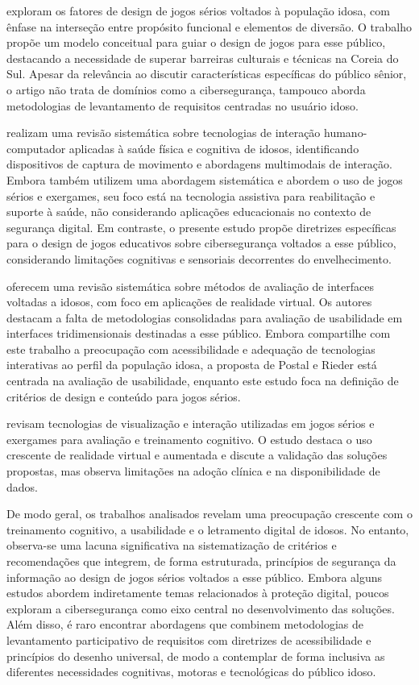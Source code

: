 \cite{lee2019study} exploram os fatores de design de jogos sérios voltados à população idosa, com ênfase na interseção entre propósito funcional e elementos de diversão. O trabalho propõe um modelo conceitual para guiar o design de jogos para esse público, destacando a necessidade de superar barreiras culturais e técnicas na Coreia do Sul. Apesar da relevância ao discutir características específicas do público sênior, o artigo não trata de domínios como a cibersegurança, tampouco aborda metodologias de levantamento de requisitos centradas no usuário idoso.

\cite{cedillo2025systematic} realizam uma revisão sistemática sobre tecnologias de interação humano-computador aplicadas à saúde física e cognitiva de idosos, identificando dispositivos de captura de movimento e abordagens multimodais de interação. Embora também utilizem uma abordagem sistemática e abordem o uso de jogos sérios e exergames, seu foco está na tecnologia assistiva para reabilitação e suporte à saúde, não considerando aplicações educacionais no contexto de segurança digital. Em contraste, o presente estudo propõe diretrizes específicas para o design de jogos educativos sobre cibersegurança voltados a esse público, considerando limitações cognitivas e sensoriais decorrentes do envelhecimento.

\cite{postal2019user} oferecem uma revisão sistemática sobre métodos de avaliação de interfaces voltadas a idosos, com foco em aplicações de realidade virtual. Os autores destacam a falta de metodologias consolidadas para avaliação de usabilidade em interfaces tridimensionais destinadas a esse público. Embora compartilhe com este trabalho a preocupação com acessibilidade e adequação de tecnologias interativas ao perfil da população idosa, a proposta de Postal e Rieder está centrada na avaliação de usabilidade, enquanto este estudo foca na definição de critérios de design e conteúdo para jogos sérios.

\cite{bassano2022visualization} revisam tecnologias de visualização e interação utilizadas em jogos sérios e exergames para avaliação e treinamento cognitivo. O estudo destaca o uso crescente de realidade virtual e aumentada e discute a validação das soluções propostas, mas observa limitações na adoção clínica e na disponibilidade de dados.

De modo geral, os trabalhos analisados revelam uma preocupação crescente com o treinamento cognitivo, a usabilidade e o letramento digital de idosos. No entanto, observa-se uma lacuna significativa na sistematização de critérios e recomendações que integrem, de forma estruturada, princípios de segurança da informação ao design de jogos sérios voltados a esse público. Embora alguns estudos abordem indiretamente temas relacionados à proteção digital, poucos exploram a cibersegurança como eixo central no desenvolvimento das soluções. Além disso, é raro encontrar abordagens que combinem metodologias de levantamento participativo de requisitos com diretrizes de acessibilidade e princípios do desenho universal, de modo a contemplar de forma inclusiva as diferentes necessidades cognitivas, motoras e tecnológicas do público idoso.

